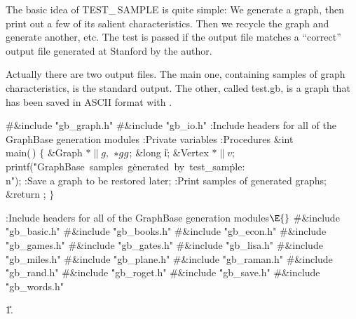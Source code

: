 The basic idea of {\sc TEST\_\,SAMPLE} is quite simple: We generate a graph,
then print out a few of its salient characteristics. Then we recycle
the graph and generate another, etc. The test is passed if the output
file matches a ``correct'' output file generated at Stanford by the author.

Actually there are two output files. The main one, containing samples of
graph characteristics, is the standard output. The other, called \.{test.gb},
is a graph that has been saved in ASCII format with .

\Y\B\8\#\&{include} \.{"gb\_graph.h"}\6
\8\#\&{include} \.{"gb\_io.h"}\6
:Include headers for all of the GraphBase generation modules\X\7
:Private variables\X\6
:Procedures\X\7
\1\1\hbox{\4}\&{int} \\{main}(\,)\2\2\6
${}\{{}$\5
\1\&{Graph} ${}{*}\|g,{}$ ${}{*}\\{gg}{}$;\5
\&{long} \|i;\5
\&{Vertex} ${}{*}\|v{}$;\7
\\{printf}(\.{"GraphBase\ samples\ g}\)\.{enerated\ by\ test\_sam}\)\.{ple:%
\\n"});\6
:Save a graph to be restored later\X;\6
:Print samples of generated graphs\X;\6
\&{return} ;\6
\4${}\}{}$\2\par
\fi

\B{}:Include headers for all of the GraphBase generation modules\X${}%
\E{}$\6
\8\#\&{include} \.{"gb\_basic.h"}\6
\8\#\&{include} \.{"gb\_books.h"}\6
\8\#\&{include} \.{"gb\_econ.h"}\6
\8\#\&{include} \.{"gb\_games.h"}\6
\8\#\&{include} \.{"gb\_gates.h"}\6
\8\#\&{include} \.{"gb\_lisa.h"}\6
\8\#\&{include} \.{"gb\_miles.h"}\6
\8\#\&{include} \.{"gb\_plane.h"}\6
\8\#\&{include} \.{"gb\_raman.h"}\6
\8\#\&{include} \.{"gb\_rand.h"}\6
\8\#\&{include} \.{"gb\_roget.h"}\6
\8\#\&{include} \.{"gb\_save.h"}\6
\8\#\&{include} \.{"gb\_words.h"}%
\par
\U1.\fi

